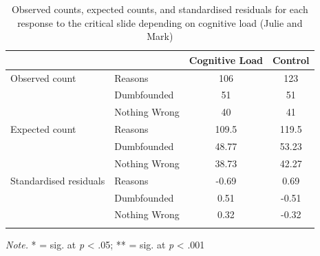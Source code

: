 \documentclass[
  man,floatsintext]{apa6}
\begin{document}
\begin{table}[tbp]

\begin{center}
\begin{threeparttable}

\caption{\label{tab:tabS6tab1dumbIncest}Observed counts, expected counts, and standardised residuals for each response to the critical slide depending on cognitive load (Julie and Mark)}

\begin{tabular}{llcc}
\toprule
 & \multicolumn{1}{c}{} & \multicolumn{1}{c}{Cognitive Load} & \multicolumn{1}{c}{Control}\\
\midrule
Observed count & Reasons & 106 & 123\\
 & Dumbfounded & 51 & 51\\
 & Nothing Wrong & 40 & 41\\
Expected count & Reasons & 109.5 & 119.5\\
 & Dumbfounded & 48.77 & 53.23\\
 & Nothing Wrong & 38.73 & 42.27\\
Standardised residuals & Reasons & -0.69 & 0.69\\
 & Dumbfounded & 0.51 & -0.51\\
 & Nothing Wrong & 0.32 & -0.32\\
\bottomrule
\addlinespace
\end{tabular}

\begin{tablenotes}[para]
\normalsize{\textit{Note.} * = sig. at \emph{p} < .05; ** = sig. at \emph{p} < .001}
\end{tablenotes}

\end{threeparttable}
\end{center}

\end{table}
\end{document}
